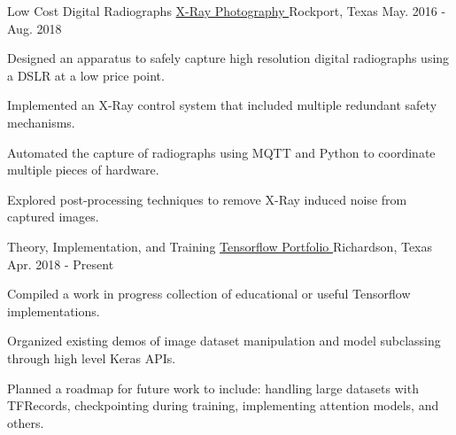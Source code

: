 

\begin{cventries}
  \cventry
    {Low Cost Digital Radiographs} %
		{
			\href{https://github.com/TidalPaladin/xray-controller.git}
			{X-Ray Photography \faGithubSquare}
		} %
    {Rockport, Texas} %
    {May. 2016 - Aug. 2018} %
	{
	\begin{cvitems}
		\item {
			Designed an apparatus to safely capture high resolution
			digital radiographs using a DSLR at
			a low price point.
		}
		\item {
			Implemented an X-Ray control system that included multiple
			redundant safety mechanisms.
		}
		\item {
			Automated the capture of radiographs using MQTT and Python
			to coordinate multiple pieces of hardware.
		}
		\item {
			Explored post-processing techniques to remove X-Ray induced
			noise from captured images.
		}
	\end{cvitems}
	}

  \cventry
  	{Theory, Implementation, and Training} %
		{
			\href{https://github.com/TidalPaladin/tensorflow-demos}
			{Tensorflow Portfolio \faGithubSquare}
		} %
    {Richardson, Texas} %
  	{Apr. 2018 - Present} %
	{
	\begin{cvitems}
		\item {
			Compiled a work in progress collection of educational or useful
			Tensorflow implementations.
		}
		\item {
			Organized existing demos of image dataset manipulation and model
			subclassing through high level Keras APIs.
		}
		\item {
			Planned a roadmap for future work to include: handling large
			datasets with TFRecords, checkpointing during training,
			\newline
			implementing attention models, and others.
		}
	\end{cvitems}
	}


\end{cventries}
